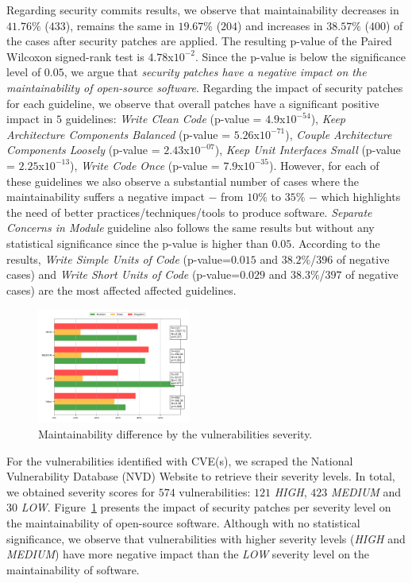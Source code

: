 \documentclass[10pt,conference]{IEEEtran}
\begin{document}
Regarding security commits results, we observe that maintainability decreases in
$41.76\%$ ($433$), remains the same in $19.67\%$ ($204$) and increases in $38.57\%$
($400$) of the cases after security patches are applied. The resulting
p-value of the Paired Wilcoxon signed-rank test is $4.78$x$10^{-2}$.
Since the p-value is below the significance level of $0.05$, we argue that
\emph{security patches have a negative impact on the maintainability of
open-source software}.
Regarding the impact of security patches for each guideline, we observe
that overall patches have a significant positive impact in $5$ guidelines: 
\emph{Write Clean Code} (p-value = $4.9$x$10^{-54}$), \emph{Keep Architecture 
Components Balanced} (p-value = $5.26$x$10^{-71}$), \emph{Couple Architecture 
Components Loosely} (p-value = $2.43$x$10^{-07}$), \emph{Keep Unit Interfaces 
Small} (p-value = $2.25$x$10^{-13}$), \emph{ Write Code Once} (p-value = 
$7.9$x$10^{-35}$). However, for each of these guidelines we also observe a substantial number of cases where the maintainability suffers a negative impact $-$ from $10\%$ to $35\%$ $-$ which highlights the need of better practices/techniques/tools to produce software. \emph{Separate Concerns in Module} 
guideline also follows the same results but without any statistical 
significance since the p-value is higher than $0.05$. According to the 
results, \emph{Write Simple Units of Code} (p-value=$0.015$ and $38.2\%$/$396$ 
of negative cases) and \emph{Write Short Units of Code} (p-value=$0.029$ and 
$38.3\%$/$397$ of negative cases) are the most affected affected guidelines.
 

\begin{figure}[h]
 	\centering 	\includegraphics[width=0.45\textwidth]{figures/maintainability_severity.pdf}
 	\caption{Maintainability difference by the vulnerabilities severity.}
	\label{fig:severity}
\end{figure}

For the vulnerabilities identified with CVE(s), we scraped the National Vulnerability Database (NVD) Website to retrieve 
their severity levels. In total, we obtained severity scores for $574$ 
vulnerabilities: $121$ \emph{HIGH}, $423$ \emph{MEDIUM} and $30$ \emph{LOW}. 
Figure~\ref{fig:severity} presents the impact
of security patches per severity level on the maintainability of open-source 
software. Although with no statistical significance, we observe that 
vulnerabilities with higher severity levels (\emph{HIGH} and \emph{MEDIUM}) have more negative impact than the \emph{LOW} severity level on the
maintainability of software.
\end{document}
